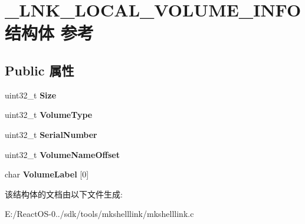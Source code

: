 \hypertarget{struct___l_n_k___l_o_c_a_l___v_o_l_u_m_e___i_n_f_o}{}\section{\+\_\+\+L\+N\+K\+\_\+\+L\+O\+C\+A\+L\+\_\+\+V\+O\+L\+U\+M\+E\+\_\+\+I\+N\+F\+O结构体 参考}
\label{struct___l_n_k___l_o_c_a_l___v_o_l_u_m_e___i_n_f_o}
\subsection*{Public 属性}
\begin{DoxyCompactItemize}
\item 
\mbox{\label{struct___l_n_k___l_o_c_a_l___v_o_l_u_m_e___i_n_f_o_ac86e6503b86941bc8ef4cf65837b50f1}} 
uint32\+\_\+t {\bfseries Size}
\item 
\mbox{\label{struct___l_n_k___l_o_c_a_l___v_o_l_u_m_e___i_n_f_o_a9585523abcede76af02f22248348eb27}} 
uint32\+\_\+t {\bfseries Volume\+Type}
\item 
\mbox{\label{struct___l_n_k___l_o_c_a_l___v_o_l_u_m_e___i_n_f_o_a820f068094d2d250d41d81b313c056fb}} 
uint32\+\_\+t {\bfseries Serial\+Number}
\item 
\mbox{\label{struct___l_n_k___l_o_c_a_l___v_o_l_u_m_e___i_n_f_o_a7fb1c5813f66329e3d67f07010b343af}} 
uint32\+\_\+t {\bfseries Volume\+Name\+Offset}
\item 
\mbox{\label{struct___l_n_k___l_o_c_a_l___v_o_l_u_m_e___i_n_f_o_aab012166ea62baaba18212881d00490b}} 
char {\bfseries Volume\+Label} \mbox{[}0\mbox{]}
\end{DoxyCompactItemize}


该结构体的文档由以下文件生成\+:\begin{DoxyCompactItemize}
\item 
E\+:/\+React\+O\+S-\/0../sdk/tools/mkshelllink/mkshelllink.\+c\end{DoxyCompactItemize}
